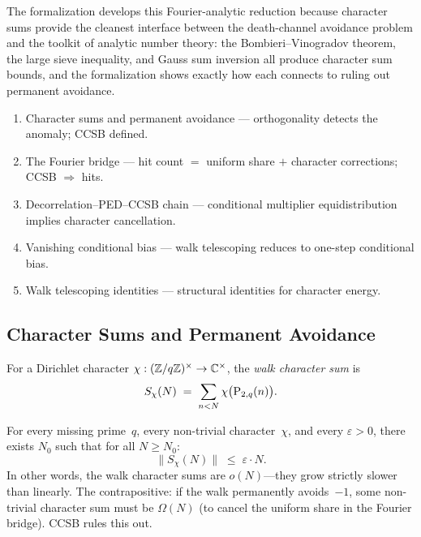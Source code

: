 The formalization develops this Fourier-analytic reduction because
character sums provide the cleanest interface between the
death-channel avoidance problem and the toolkit of analytic number
theory: the Bombieri--Vinogradov theorem, the large sieve inequality,
and Gauss sum inversion all produce character sum bounds, and the
formalization shows exactly how each connects to ruling out permanent
avoidance.

\begin{roadmap}
\begin{enumerate}[nosep,leftmargin=*]
\item[\S4.1] Character sums and permanent avoidance --- orthogonality detects the anomaly; CCSB defined.
\item[\S4.2] The Fourier bridge --- hit count $=$ uniform share $+$ character corrections; CCSB $\Rightarrow$ hits.
\item[\S4.3] Decorrelation--PED--CCSB chain --- conditional multiplier equidistribution implies character cancellation.
\item[\S4.4] Vanishing conditional bias --- walk telescoping reduces to one-step conditional bias.
\item[\S4.5] Walk telescoping identities --- structural identities for character energy.
\end{enumerate}
\end{roadmap}

\subsection{Character Sums and Permanent Avoidance}

For a Dirichlet character $\chi : (\mathbb{Z}/q\mathbb{Z})^\times \to \mathbb{C}^\times$,
the \emph{walk character sum} is
\[
  S_\chi(N) \;=\; \sum_{n < N} \chi\bigl(\mathrm{P}_{2,q}(n)\bigr).
\]

\begin{property}
For every missing prime~$q$, every non-trivial character~$\chi$, and
every $\varepsilon > 0$, there exists $N_0$ such that for all
$N \geq N_0$:
\[
  \|S_\chi(N)\| \;\leq\; \varepsilon \cdot N.
\]
In other words, the walk character sums are $o(N)$---they grow
strictly slower than linearly.  The contrapositive: if the walk
permanently avoids~$-1$, some non-trivial character sum must be
$\Omega(N)$ (to cancel the uniform share in the Fourier bridge).
CCSB rules this out.
\end{property}

